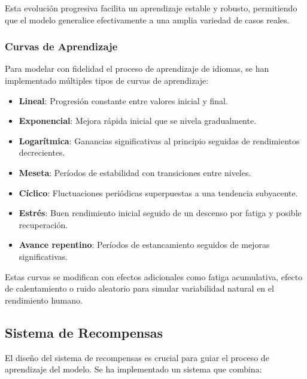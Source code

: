 Esta evolución progresiva facilita un aprendizaje estable y robusto, permitiendo que el modelo generalice efectivamente a una amplia variedad de casos reales.


\subsubsection{Curvas de Aprendizaje}
\label{curvas-aprendizaje}

Para modelar con fidelidad el proceso de aprendizaje de idiomas, se han implementado múltiples tipos de curvas de aprendizaje:

\begin{itemize}
    \item \textbf{Lineal}: Progresión constante entre valores inicial y final.
    \item \textbf{Exponencial}: Mejora rápida inicial que se nivela gradualmente.
    \item \textbf{Logarítmica}: Ganancias significativas al principio seguidas de rendimientos decrecientes.
    \item \textbf{Meseta}: Períodos de estabilidad con transiciones entre niveles.
    \item \textbf{Cíclico}: Fluctuaciones periódicas superpuestas a una tendencia subyacente.
    \item \textbf{Estrés}: Buen rendimiento inicial seguido de un descenso por fatiga y posible recuperación.
    \item \textbf{Avance repentino}: Períodos de estancamiento seguidos de mejoras significativas.
\end{itemize}

Estas curvas se modifican con efectos adicionales como fatiga acumulativa, efecto de calentamiento o ruido aleatorio para simular variabilidad natural en el rendimiento humano.

\subsection{Sistema de Recompensas}
\label{sistema-recompensas-ppo}

El diseño del sistema de recompensas es crucial para guiar el proceso de aprendizaje del modelo. Se ha implementado un sistema que combina:

